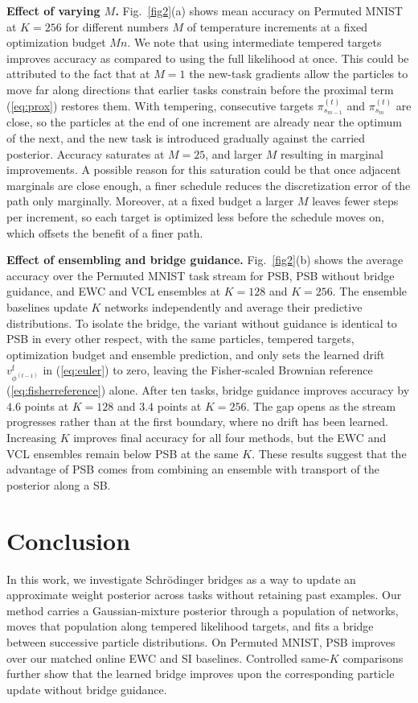\documentclass{article}
\begin{document}
\textbf{Effect of varying $M$.} Fig.~\ref{fig2}(a) shows mean accuracy on
Permuted MNIST at $K=256$ for different numbers $M$ of temperature increments
at a fixed optimization budget $Mn$. We note that using intermediate tempered targets improves accuracy as compared to using the full likelihood at once. This could be attributed to the fact that at $M=1$ the new-task gradients allow the particles to move far along directions that earlier tasks constrain before the proximal term (\ref{eq:prox}) restores them. With tempering, consecutive targets $\pi^{(t)}_{s_{m-1}}$ and $\pi^{(t)}_{s_m}$ are close, so the particles at the end of one increment are already near the optimum of the next, and the new task is introduced gradually against the carried posterior. Accuracy saturates at $M=25$, and larger $M$ resulting in marginal improvements. A possible reason for this saturation could be that once adjacent marginals are close enough, a finer schedule reduces the discretization error of the
path only marginally. Moreover, at a fixed budget a larger $M$ leaves fewer steps per increment, so
each target is optimized less before the schedule moves on, which offsets the
benefit of a finer path.

\textbf{Effect of ensembling and bridge guidance.} Fig.~\ref{fig2}(b) shows the
average accuracy over the Permuted MNIST task stream for PSB, PSB
without bridge guidance, and EWC and VCL ensembles at $K=128$ and $K=256$. The
ensemble baselines update $K$ networks independently and average their
predictive distributions. To isolate the bridge, the variant without guidance is identical to PSB in
every other respect, with the same particles, tempered targets, optimization
budget and ensemble prediction, and only sets the learned drift
$v^{\mathrm f}_{\phi^{(t-1)}}$ in (\ref{eq:euler}) to zero, leaving the
Fisher-scaled Brownian reference (\ref{eq:fisherreference}) alone.
After ten tasks, bridge guidance improves accuracy by $4.6$ points at $K=128$
and $3.4$ points at $K=256$. The gap opens as the stream progresses rather than at the first boundary, where no drift has been learned. Increasing $K$ improves final accuracy for all four methods, but the EWC and VCL ensembles remain below PSB at the same $K$. These results suggest that the advantage of PSB comes from combining an ensemble with transport of the posterior along a SB.

\section{Conclusion}

In this work, we investigate Schr\"odinger bridges as a way to update an
approximate weight posterior across tasks without retaining past examples.
Our method carries a Gaussian-mixture posterior through a population of
networks, moves that population along tempered likelihood targets, and
fits a bridge between successive particle distributions. On Permuted MNIST,
PSB improves over our matched online EWC and SI baselines. Controlled same-$K$ comparisons further show that the learned bridge improves upon the corresponding particle update without bridge guidance. 



\end{document}
